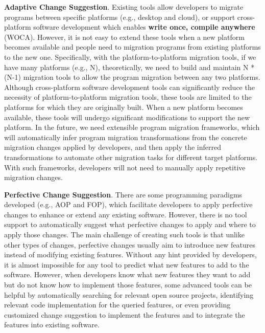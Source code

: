 \textbf{Adaptive Change Suggestion}. Existing tools allow developers to migrate programs between specific platforms (e.g., desktop and cloud), or support cross-platform software development which enables \textbf{write once, compile anywhere} (WOCA). However, it is not easy to extend these tools when a new platform becomes available and people need to migration programs from existing platforms to the new one. Specifically, 
with the platform-to-platform migration tools, if we have many platforms (e.g., N), theoretically, we need to build and maintain N * (N-1) migration tools to allow the program migration between any two platforms. Although cross-platform software development tools can significantly reduce the necessity of platform-to-platform migration tools, these tools are limited to the platforms for which they are originally built. When a new platform becomes available, these tools will undergo significant modifications to support the new platform. In the future, we need extensible program migration frameworks, which will automatically infer program migration transformations from the concrete migration changes applied by developers, and then apply the inferred transformations to automate other migration tasks for different target platforms. With such frameworks, developers will not need to manually apply repetitive migration changes. 

\textbf{Perfective Change Suggestion}. There are some programming paradigms developed (e.g., AOP and FOP), which facilitate developers to apply perfective changes to enhance or extend any existing software. However, there is no tool support to automatically suggest what perfective changes to apply and where to apply those changes. The main challenge of creating such tools is that unlike other types of changes, perfective changes usually aim to introduce new features instead of modifying existing features. Without any hint provided by developers, it is almost impossible for any tool to predict what new features to add to the software. However, when developers know what new features they want to add but do not know how to implement those features, some advanced tools can be helpful by automatically searching for relevant open source projects, identifying relevant code implementation for the queried features, or even providing customized change suggestion to implement the features and to integrate the features into existing software.

